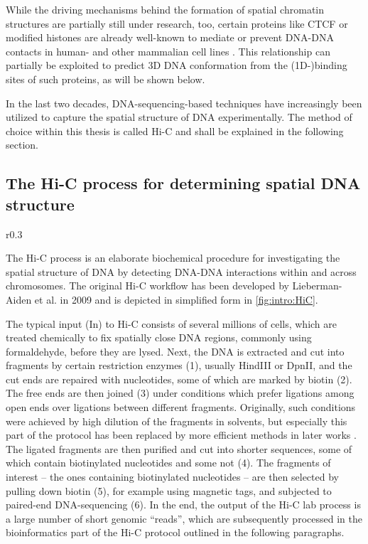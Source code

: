 While the driving mechanisms behind the formation of spatial chromatin structures are partially still under research, too,
certain proteins like CTCF or modified histones are already well-known to mediate or prevent DNA-DNA contacts in human- and other mammalian cell lines \cite{Phillips2009,PhillipsCremins2013,Dixon2015}.
This relationship can partially be exploited to predict 3D DNA conformation from the (1D\mbox{-})binding sites of such proteins, as will be shown below.

In the last two decades, DNA-sequencing-based techniques have increasingly been utilized to capture the spatial structure of DNA experimentally.
The method of choice within this thesis is called Hi-C and shall be explained in the following section.

\subsection{The Hi-C process for determining spatial DNA structure} \label{sec:intro:hic}
\begin{wrapfigure}[34]{r}{0.3\textwidth}
 \vspace{-7mm}
 \caption{Hi-C lab process}
 \label{fig:intro:HiC}
\end{wrapfigure}
The Hi-C process is an elaborate biochemical procedure for investigating the 
spatial structure of DNA by detecting DNA-DNA interactions within and 
across chromosomes.
The original Hi-C workflow has been developed by Lieberman-Aiden et al. in 2009  \cite{LiebermanAiden2009}
and is depicted in simplified form in \cref{fig:intro:HiC}.

The typical input (In) to Hi-C consists of several millions of cells,
which are treated chemically to fix spatially close DNA regions, 
commonly using formaldehyde, before they are lysed.
Next, the DNA is extracted and cut into fragments by certain restriction enzymes (1),
usually HindIII or DpnII, 
and the cut ends are repaired with nucleotides, some of which are marked by biotin (2).
The free ends are then joined (3) under conditions which prefer
ligations among open ends over ligations between different fragments.
Originally, such conditions were achieved by high dilution of the fragments in
solvents, but especially this part of the protocol has been replaced by 
more efficient methods in later works \cite{Rao2014,Belaghzal2017}.
The ligated fragments are then purified and cut into shorter sequences,
some of which contain biotinylated nucleotides and some not (4).
The fragments of interest -- the ones containing biotinylated nucleotides -- 
are then selected by pulling down biotin (5), for example using magnetic tags,  
and subjected to paired-end DNA-sequencing (6).
In the end, the output of the Hi-C lab process is a large number of short genomic ``reads'',
which are subsequently processed in the bioinformatics part of the Hi-C protocol 
outlined in the following paragraphs.

